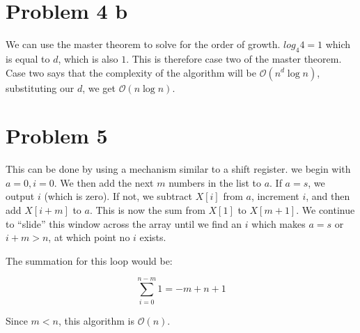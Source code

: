 \documentclass{article}
\newenvironment{problem}[1]{
  \nobreak\section*{Problem #1}
}{}
\newcommand*{\bigO}[1]{\ensuremath{\mathcal{O}\left(#1\right)}}
\begin{document}
  \begin{problem}{4 b}
    We can use the master theorem to solve for the order of growth.
    $log_4{4} = 1$ which is equal to $d$, which is also $1$.  This is
    therefore case two of the master theorem.  Case two says that the
    complexity of the algorithm will be \bigO{n^d \log{n}}, substituting
    our $d$, we get \bigO{n\log{n}}.
  \end{problem}

  \begin{problem}{5}
    This can be done by using a mechanism similar to a shift register.  we begin with
    $a = 0, i = 0$.  We then add the next $m$ numbers in the list to $a$.  If
    $a = s$, we output $i$ (which is zero).  If not, we subtract $X[i]$ from $a$,
    increment $i$, and then add $X[i + m]$ to $a$.  This is now the sum from $X[1]$ to
    $X[m + 1]$.  We continue to ``slide'' this window across the array until we find an
    $i$ which makes $a = s$ or $i + m > n$, at which point no $i$ exists.
    
    The summation for this loop would be:

    \begin{displaymath}
      \sum_{i = 0}^{n - m} 1 = -m + n + 1
    \end{displaymath}

    Since $m < n$, this algorithm is \bigO{n}.
  \end{problem}
\end{document}
